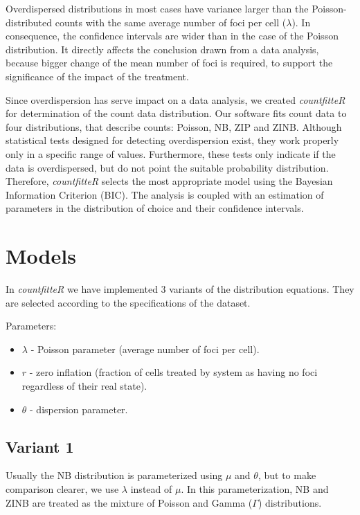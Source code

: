 Overdispersed distributions in most cases have variance larger than the Poisson-distributed counts with the same average number of foci per cell ($\lambda$). In consequence, the confidence intervals are wider than in the case of the Poisson distribution. It directly affects the conclusion drawn from a data analysis, because bigger change of the mean number of foci is required, to support the significance of the impact of the treatment. 

Since overdispersion has serve impact on a data analysis, we created \emph{countfitteR} for determination of the count data distribution. Our software fits count data to four distributions, that describe counts: Poisson, NB, ZIP and ZINB. Although statistical tests designed for detecting overdispersion exist, they work properly only in a specific range of values. Furthermore, these tests only indicate if the data is overdispersed, but do not point the suitable probability distribution. Therefore, \emph{countfitteR} selects the most appropriate model using the Bayesian Information Criterion (BIC). The analysis is coupled with an estimation of parameters in the distribution of choice and their confidence intervals.

\section{Models}

In \emph{countfitteR} we have implemented 3 variants of the distribution equations. They are selected according to the specifications of the dataset. %

Parameters:
\begin{itemize}
\item $\lambda$ - Poisson parameter (average number of foci per cell). 
\item $r$ - zero inflation (fraction of cells treated by system as having no foci regardless of their real state).
\item $\theta$ - dispersion parameter.
\end{itemize}

\subsection{Variant 1}

Usually the NB distribution is parameterized using $\mu$ and $\theta$, but to make comparison clearer, we use $\lambda$ instead of $\mu$. In this parameterization, NB and ZINB are treated as the mixture of Poisson and Gamma ($\Gamma$) distributions.  

